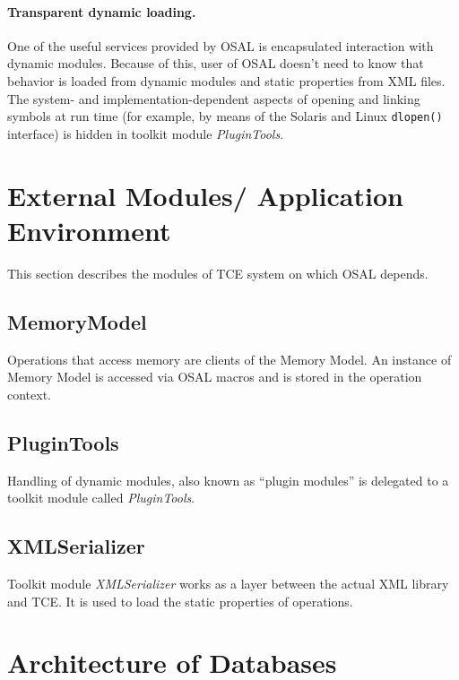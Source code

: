 \documentclass[a4paper,twoside]{tce}
\begin{document}
\paragraph{Transparent dynamic loading.}
One of the useful services provided by OSAL is encapsulated interaction
with dynamic modules. Because of this, user of OSAL doesn't need to know 
that behavior is loaded from dynamic modules and static properties from 
XML files.  The system- and implementation-dependent aspects
of opening and linking symbols at run time (for example, by means of the
Solaris and Linux \verb#dlopen()# interface) is hidden in toolkit module
\emph{PluginTools}.

\section{External Modules/ Application Environment}


This section describes the modules of TCE system on which OSAL depends.

\subsection{MemoryModel}

Operations that access memory are clients of the Memory Model. An instance
of Memory Model is accessed via OSAL macros and is stored in the operation
context.

\subsection{PluginTools}

Handling of dynamic modules, also known as ``plugin modules'' is delegated
to a toolkit module called \emph{PluginTools}.

\subsection{XMLSerializer}

Toolkit module \emph{XMLSerializer} works as a layer between the actual XML
library and TCE.  It is used to load the static properties of operations.

\section{Architecture of Databases}
\end{document}
